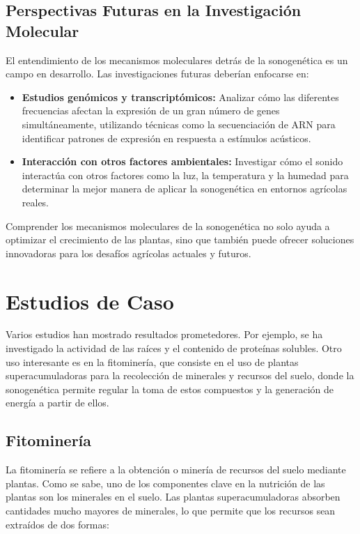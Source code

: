 \documentclass[twocolumn]{article}
\begin{document}
\subsection{Perspectivas Futuras en la Investigación Molecular}

El entendimiento de los mecanismos moleculares detrás de la sonogenética es un campo en desarrollo. Las investigaciones futuras deberían enfocarse en:

\begin{itemize}
    \item \textbf{Estudios genómicos y transcriptómicos:} Analizar cómo las diferentes frecuencias afectan la expresión de un gran número de genes simultáneamente, utilizando técnicas como la secuenciación de ARN para identificar patrones de expresión en respuesta a estímulos acústicos.
    
    \item \textbf{Interacción con otros factores ambientales:} Investigar cómo el sonido interactúa con otros factores como la luz, la temperatura y la humedad para determinar la mejor manera de aplicar la sonogenética en entornos agrícolas reales.
\end{itemize}

Comprender los mecanismos moleculares de la sonogenética no solo ayuda a optimizar el crecimiento de las plantas, sino que también puede ofrecer soluciones innovadoras para los desafíos agrícolas actuales y futuros.


\section{Estudios de Caso}
Varios estudios han mostrado resultados prometedores. Por ejemplo, se ha investigado la actividad de las raíces y el contenido de proteínas solubles. Otro uso interesante es en la fitominería, que consiste en el uso de plantas superacumuladoras para la recolección de minerales y recursos del suelo, donde la sonogenética permite regular la toma de estos compuestos y la generación de energía a partir de ellos.

\subsection{Fitominería}
La fitominería se refiere a la obtención o minería de recursos del suelo mediante plantas. Como se sabe, uno de los componentes clave en la nutrición de las plantas son los minerales en el suelo. Las plantas superacumuladoras absorben cantidades mucho mayores de minerales, lo que permite que los recursos sean extraídos de dos formas:
\end{document}
